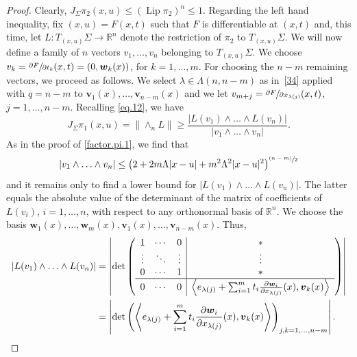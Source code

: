 \documentclass[JEP,XML,SOM,Unicode,ThmDefs,NoEqCountersInSection]{cedram}
\newcommand{\psfrac}[2]{\sfrac{(#1)}{#2}}
\newcommand{\R}{\mathbb{R}}
\newcommand{\Rn}{\R^n}
\newcommand{\bv}{{\boldsymbol{v}}}
\newcommand{\bw}{{\boldsymbol{w}}}
\DeclareMathOperator{\rmLip}{\mathrm{Lip}}
\let\la\langle
\let\ra\rangle
\begin{document}
\begin{proof}
Clearly, $J_\Sigma \pi_2(x,u) \leq (\rmLip \pi_2)^n \leq 1$.
Regarding the left hand inequality, fix $(x,u) = F(x,t)$ such that $F$ is differentiable at $(x,t)$ and, this time, let \hbox{$L: T_{(x,u)}\Sigma \to \R^n$} denote the restriction of $\pi_2$ to $T_{(x,u)}\Sigma$.
We will now define a family of $n$ vectors $v_1,\ldots,v_n$ belonging to $T_{(x,u)}\Sigma$.
We choose $v_k = \sfrac{\partial F}{\partial t_k}(x,t) = (0,\bw_k(x))$, for $k=1,\ldots,m$.
For choosing the $n-m$ remaining vectors, we proceed as follows.
We select $\lambda \in \Lambda(n,n-m)$ as in~\ref{34} applied with $q=n-m$ to $\bv_1(x),\ldots,\bv_{n-m}(x)$ and we let $v_{m+j} = \sfrac{\partial F}{\partial x_{\lambda(j)}}(x,t)$, $j=1,\ldots,n-m$.
Recalling \eqref{eq.12}, we have
\begin{equation*}
J_\Sigma \pi_1(x,u) = \|{\wedge}_n L \| \geq \frac{|L(v_1) \wedge \ldots \wedge L(v_n)|}{|v_1 \wedge \ldots \wedge v_n|}.
\end{equation*}
As in the proof of \ref{factor.pi.1}, we find that
\begin{equation*}
|v_1 \wedge \ldots \wedge v_n| \leq \left(2 + 2 m \Lambda |x-u| + m^2\Lambda^2|x-u|^2 \right)^{\psfrac{n-m}{2}}
\end{equation*}
and it remains only to find a lower bound for $|L(v_1) \wedge \ldots \wedge L(v_n)|$.
The latter equals the absolute value of the determinant of the matrix of coefficients of $L(v_i)$, $i=1,\ldots,n$, with respect to any orthonormal basis of $\Rn$.
We choose the basis $\bw_1(x),\ldots,\bw_m(x),\bv_1(x),\ldots,\bv_{n-m}(x)$.
Thus,
\begin{equation}
\label{eq.13}
\begin{split}
|L(v_1) \wedge \ldots \wedge L(v_n)| & = \left| \det \left(
\begin{array}{c c c | c}
1 & \cdots & 0 & * \\
\vdots & \ddots & \vdots & \vdots \\
0 & \cdots & 1 & * \\
\hline
0 & \cdots & 0 & \left\la e_{\lambda(j)} + \sum_{i=1}^m t_i \frac{\partial \bw_i}{\partial x_{\lambda(j)}}(x), \bv_k(x) \right\ra \\
\end{array}
\right)\right| \\
& = \left| \det \left(\left\la e_{\lambda(j)} + \sum_{i=1}^m t_i \frac{\partial \bw_i}{\partial x_{\lambda(j)}}(x), \bv_k(x) \right\ra\right)_{j,k=1,\ldots,n-m}\right|.
\end{split}

\end{equation}
\end{proof}
\end{document}
